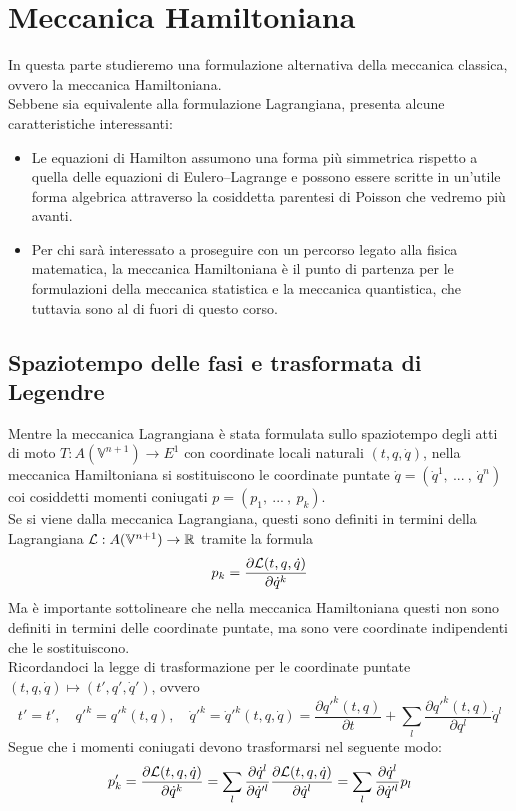 \documentclass[openany]{book}
\renewcommand\V{\mathbb{V}}
\begin{document}
\chapter{Meccanica Hamiltoniana}

In questa parte studieremo una formulazione alternativa della meccanica classica, ovvero la meccanica Hamiltoniana.\\
Sebbene sia equivalente alla formulazione Lagrangiana, presenta alcune caratteristiche interessanti:\begin{itemize}
    \item Le equazioni di Hamilton assumono una forma più simmetrica rispetto a quella delle equazioni di Eulero--Lagrange e possono essere scritte in un'utile forma algebrica attraverso la cosiddetta parentesi di Poisson che vedremo più avanti.
    \item Per chi sarà interessato a proseguire con un percorso legato alla fisica matematica, la meccanica Hamiltoniana è il punto di partenza per le formulazioni della meccanica statistica e la meccanica quantistica, che tuttavia sono al di fuori di questo corso.
\end{itemize}

\newcommand\Leg{\mathbb L}
\section{Spaziotempo delle fasi e trasformata di Legendre}

Mentre la meccanica Lagrangiana è stata formulata sullo spaziotempo degli atti di moto $T:A(\V^{n+1})\to E^1$ con coordinate locali naturali $(t,q,\dot q)$, nella meccanica Hamiltoniana si sostituiscono le coordinate puntate $\dot q = (\dot q^1,\ ...\ ,\  \dot q^n)$ coi cosiddetti momenti coniugati $p = (p_1,\ ...\ ,\ p_k)$.\\
Se si viene dalla meccanica Lagrangiana, questi sono definiti in termini della Lagrangiana $\L:A(\V^{n+1})\to\R$ tramite la formula 
\[ p_k = \frac{\partial \mathcal{L}(t,q,\dot q)}{\partial \dot q^k} \]
Ma è importante sottolineare che nella meccanica Hamiltoniana questi non sono definiti in termini delle coordinate puntate, ma sono vere coordinate indipendenti che le sostituiscono.\\
Ricordandoci la legge di trasformazione per le coordinate puntate $(t,q,\dot q)\mapsto(t', q', \dot q')$, ovvero 
\[ t' = t',\quad q'^k = q'^k(t,q),\quad \dot q'^k = \dot q'^k(t,q,\dot q) = \frac{\partial q'^k(t,q)}{\partial t} + \sum_l \frac{\partial q'^k(t,q) }{\partial q^l}\dot q^l  \]
Segue che i momenti coniugati devono trasformarsi nel seguente modo:
\[p'_k = \frac{\partial \mathcal{L}(t,q,\dot q)}{\partial \dot q^k} = \sum_l \frac{\partial \dot q^l}{\partial \dot q'^l} \frac{\partial \mathcal{L}(t,q,\dot q)}{\partial \dot q^l} = \sum_l \frac{\partial \dot q^l}{\partial \dot q'^l} p_l \]
\end{document}
